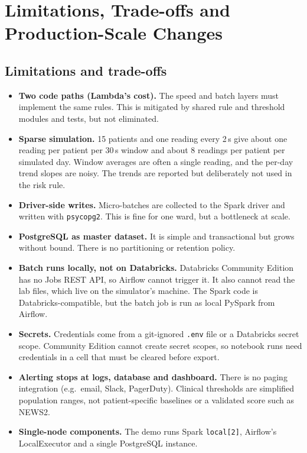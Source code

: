 \documentclass[11pt,a4paper]{article}
\newcommand{\code}[1]{\nolinkurl{#1}}
\begin{document}
\section{Limitations, Trade-offs and Production-Scale Changes}
\subsection{Limitations and trade-offs}
\begin{itemize}
  \item \textbf{Two code paths (Lambda's cost).} The speed and batch layers must implement the
  same rules. This is mitigated by shared rule and threshold modules and tests, but not eliminated.
  \item \textbf{Sparse simulation.} 15 patients and one reading every 2\,s give about one reading
  per patient per 30\,s window and about 8 readings per patient per simulated day. Window
  averages are often a single reading, and the per-day trend slopes are noisy. The trends are
  reported but deliberately not used in the risk rule.
  \item \textbf{Driver-side writes.} Micro-batches are collected to the Spark driver and written
  with \code{psycopg2}. This is fine for one ward, but a bottleneck at scale.
  \item \textbf{PostgreSQL as master dataset.} It is simple and transactional but grows without
  bound. There is no partitioning or retention policy.
  \item \textbf{Batch runs locally, not on Databricks.} Databricks Community Edition has no Jobs
  REST API, so Airflow cannot trigger it. It also cannot read the lab files, which live on the
  simulator's machine. The Spark code is Databricks-compatible, but the batch job is run as local
  PySpark from Airflow.
  \item \textbf{Secrets.} Credentials come from a git-ignored \code{.env} file or a Databricks
  secret scope. Community Edition cannot create secret scopes, so notebook runs need credentials
  in a cell that must be cleared before export.
  \item \textbf{Alerting stops at logs, database and dashboard.} There is no paging integration
  (e.g.\ email, Slack, PagerDuty). Clinical thresholds are simplified population ranges, not
  patient-specific baselines or a validated score such as NEWS2.
  \item \textbf{Single-node components.} The demo runs Spark \code{local[2]}, Airflow's
  LocalExecutor and a single PostgreSQL instance.
\end{itemize}
\end{document}
